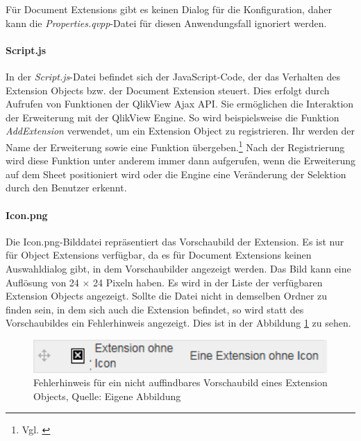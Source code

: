Für Document Extensions gibt es keinen Dialog für die Konfiguration, daher kann die \textit{Properties.qvpp}-Datei für diesen Anwendungs\-fall ignoriert werden.

\paragraph{Script.js}

In der \textit{Script.js}-Datei befindet sich der JavaScript-Code, der das Verhalten des Extension Objects bzw. der Document Extension steuert. Dies erfolgt durch Aufrufen von Funktionen der QlikView Ajax API. Sie ermöglichen die Interaktion der Erweiterung mit der QlikView Engine. So wird beispielsweise die Funktion \textit{AddExtension} verwendet, um ein Extension Object zu registrieren. Ihr werden der Name der Erweiterung sowie eine Funktion übergeben.\footnote{Vgl. \cite{QlikViewAjaxJavaScriptLibraryAddExtension}} Nach der Registrierung wird diese Funktion unter anderem immer dann aufgerufen, wenn die Erweiterung auf dem Sheet positioniert wird oder die Engine eine Veränderung der Selektion durch den Benutzer erkennt.




\newpage
\paragraph{Icon.png}

Die Icon.png-Bild\-datei repräsentiert das Vorschaubild der Extension. Es ist nur für Object Extensions verfügbar, da es für Document Extensions keinen Auswahldialog gibt, in dem Vorschaubilder angezeigt werden. Das Bild kann eine Auflösung von 24 × 24 Pixeln haben. Es wird in der Liste der verfügbaren Extension Objects angezeigt. Sollte die Datei nicht in demselben Ordner zu finden sein, in dem sich auch die Extension befindet, so wird statt des Vorschau\-bildes ein Fehler\-hinweis angezeigt. Dies ist in der Abbildung \ref{fig:OhneIcon} zu sehen.

\ifIncludeFigures\begin{figure}[htbp]
	\centering
		\includegraphics[width=1.00\textwidth]{img/OhneIcon/OhneIcon.png}
	\caption[Fehlerhinweis für ein nicht auffindbares Vorschaubild eines Extension Objects]{Fehlerhinweis für ein nicht auffindbares Vorschaubild eines Extension Objects, Quelle: Eigene Abbildung}
	\label{fig:OhneIcon}
\end{figure}\fi


